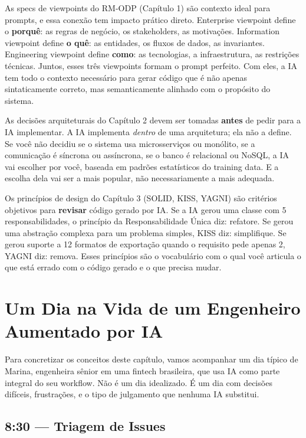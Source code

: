 As specs de viewpoints do RM-ODP (Capítulo 1) são contexto ideal para prompts, e essa
conexão tem impacto prático direto. Enterprise viewpoint define o \textbf{porquê}: as
regras de negócio, os stakeholders, as motivações. Information viewpoint define
\textbf{o quê}: as entidades, os fluxos de dados, as invariantes. Engineering
viewpoint define \textbf{como}: as tecnologias, a infraestrutura, as restrições
técnicas. Juntos, esses três viewpoints formam o prompt perfeito. Com eles, a IA tem
todo o contexto necessário para gerar código que é não apenas sintaticamente correto,
mas semanticamente alinhado com o propósito do sistema.

As decisões arquiteturais do Capítulo 2 devem ser tomadas \textbf{antes} de pedir para
a IA implementar. A IA implementa \textit{dentro} de uma arquitetura; ela não a
define. Se você não decidiu se o sistema usa microsserviços ou monólito, se a comunicação
é síncrona ou assíncrona, se o banco é relacional ou NoSQL, a IA vai escolher por você,
baseada em padrões estatísticos do training data. E a escolha dela vai ser a mais
popular, não necessariamente a mais adequada.

Os princípios de design do Capítulo 3 (SOLID, KISS, YAGNI) são critérios
objetivos para \textbf{revisar} código gerado por IA. Se a IA gerou uma classe com 5
responsabilidades, o princípio da Responsabilidade Única diz: refatore. Se gerou uma
abstração complexa para um problema simples, KISS diz: simplifique. Se gerou suporte
a 12 formatos de exportação quando o requisito pede apenas 2, YAGNI diz: remova. Esses
princípios são o vocabulário com o qual você articula o que está errado com o código
gerado e o que precisa mudar.

\section{Um Dia na Vida de um Engenheiro Aumentado por IA}

Para concretizar os conceitos deste capítulo, vamos acompanhar um dia
típico de Marina, engenheira sênior em uma fintech brasileira, que usa
IA como parte integral do seu workflow. Não é um dia idealizado. É
um dia com decisões difíceis, frustrações, e o tipo de julgamento que
nenhuma IA substitui.

\subsection{8:30 --- Triagem de Issues}

